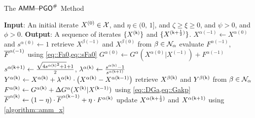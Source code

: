 \begin{algorithm}[t]
	\caption{The $\mathsf{AMM\!\!-\!\!PGO}^{\#}$ Method}
	\label{algorithm::amm}
	\begin{algorithmic}[1]
		\State\textbf{Input}: An initial iterate $X^{(0)}\in \mathcal{X}$, and $\eta\in(0,\,1]$, and $\zeta \geq \xi \geq 0$, and $\psi>0$, and $\phi>0$.
		 \vspace{0.1em}
		\State\textbf{Output}: A sequence of iterates $\{X^{(\mathsf{k})}\}$ and $\{X^{(\mathsf{k}+\frac{1}{2})}\}$.\vspace{0.2em} 	
		\vspace{0.1em}
		\State $X^{\alpha(-1)}\gets X^{\alpha(0)}$ and $s^{\alpha(0)}\gets 1$\label{line::alg5::s0}
		\vspace{0.1em}
		\State retrieve $X^{\beta(-1)}$ and $X^{\beta(0)}$ from $\beta\in\mathcal{N}_{\alpha}$\label{line::alg5::comm1}
		\vspace{0.1em}
		\State evaluate $F^{\alpha(-1)}$, $\overline{F}^{\alpha(-1)}$ using \cref{eq::Fa0,eq::sFa0}\label{line::alg5::Fakp2}
		\vspace{0.1em}
		\State $G^{\alpha(0)} \leftarrow G^\alpha(X^{\alpha(0)}|X^{(-1)}) + F^{\alpha(-1)}$\label{line::alg5::G}
		\vspace{0.1em}
		\EndFor
		\vspace{0.1em}
		\State $s^{\alpha(\mathsf{k}+1)}\gets\tfrac{\sqrt{4{s^{\alpha(\mathsf{k})}}^2+1}+1}{2}$,\; $\lambda^{\alpha(\mathsf{k})}\gets \tfrac{s^{\alpha(\mathsf{k})}-1}{s^{\alpha(\mathsf{k}+1)}}$\label{line::alg5::sk}
		\vspace{0.1em}
		\State $Y^{\alpha(\mathsf{k})}\gets X^{\alpha(\mathsf{k})}+\lambda^{\alpha(\mathsf{k})}\cdot\big(X^{\alpha(\mathsf{k})}-X^{\alpha(\mathsf{k}-1)}\big)$\label{line::alg5::Yk}
		\vspace{0.1em}
		\State retrieve $X^{\beta(\mathsf{k})}$ and $Y^{\beta(\mathsf{k})}$ from $\beta\in\mathcal{N}_{\alpha}$\label{line::alg5::comm}
		\vspace{0.1em}
		\State $F^{\alpha(\mathsf{k})}\leftarrow G^{\alpha(\mathsf{k})} + \Delta G^{\alpha}(X^{(\mathsf{k})}|X^{(\mathsf{k}-1)})$ using \cref{eq::DGa,eq::Gakp} \label{line::alg5::Fakp1}
		\vspace{0.1em}
		\State $\overline{F}^{\alpha(\mathsf{k})}\gets (1-\eta)\cdot \overline{F}^{\alpha(\mathsf{k}-1)} + \eta\cdot F^{\alpha(\mathsf{k})}$\label{line::alg5::lFakp}
		\vspace{0.1em}
		\State 	update $X^{\alpha(\mathsf{k}+\frac{1}{2})}$ and $X^{\alpha(\mathsf{k}+1)}$ using \cref{algorithm::amm_x}
		\EndFor
		\EndFor
	\end{algorithmic}
\end{algorithm}